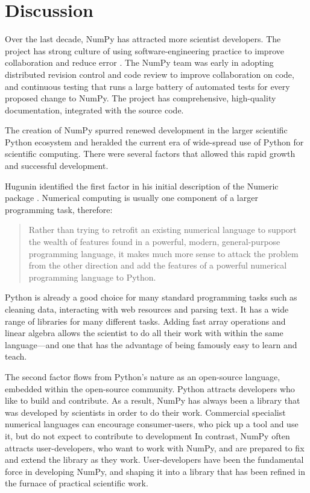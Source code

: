 \section*{Discussion}


Over the last decade, NumPy has attracted more scientist developers.
The project has strong culture of using software-engineering practice to
improve collaboration and reduce error \cite{millman2014developing}.
The NumPy team was early in adopting distributed
revision control and code review to improve collaboration on code, and
continuous testing that runs a large battery of automated tests for every proposed
change to NumPy.
The project has comprehensive, high-quality documentation,
integrated with the source
code\cite{vanderwalt2008scipy,harrington2008scipy,harrington2009scipy}. 

The creation of NumPy spurred renewed development in the larger scientific
Python ecosystem and heralded the current era of wide-spread use of Python for
scientific computing.
There were several factors that allowed this rapid growth
and successful development.

Hugunin identified the first factor in his initial description of the Numeric
package \cite{Hugunin-whitepaper}.  Numerical computing is usually one
component of a larger programming task, therefore:

\begin{quote}
    Rather than trying to retrofit an existing numerical language to support
    the wealth of features found in a powerful, modern, general-purpose
    programming language, it makes much more sense to attack the problem from
    the other direction and add the features of a powerful numerical
    programming language to Python.
\end{quote}

Python is already a good choice for many standard programming tasks such as
cleaning data, interacting with web resources and parsing text.  It has a wide
range of libraries for many different tasks. Adding fast array operations and
linear algebra allows the scientist to do all their work with within the same
language---and one that has the advantage of being famously easy to learn and
teach.

The second factor flows from Python's nature as an open-source language,
embedded within the open-source community.  Python attracts developers who like
to build and contribute.  As a result, NumPy has always been a library that was
developed by scientists in order to do their work.  Commercial specialist
numerical languages can encourage consumer-users, who pick up a tool and use
it, but do not expect to contribute to development%
In contrast, NumPy often
attracts user-developers, who want to work with NumPy, and are prepared to fix
and extend the library as they work. User-developers have been the fundamental
force in developing NumPy, and shaping it into a library that has been refined
in the furnace of practical scientific work.

